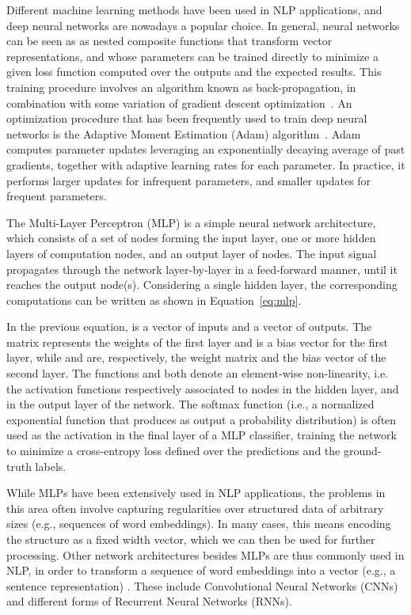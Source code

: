 Different machine learning methods have been used in NLP applications, and deep neural networks are nowadays a popular choice. In general, neural networks can be seen as as nested composite functions that transform vector representations, and whose parameters can be trained directly to minimize a given loss function computed over the outputs and the expected results. This training procedure involves an algorithm known as back-propagation, in combination with some variation of gradient descent optimization~\citep{primer}. An optimization procedure that has been frequently used to train deep neural networks is the Adaptive Moment Estimation (Adam) algorithm~\cite{kingma2014adam}. Adam computes parameter updates leveraging an exponentially decaying average of past gradients, together with adaptive learning rates for each parameter. In practice, it performs larger updates for infrequent parameters, and smaller updates for frequent parameters.

The Multi-Layer Perceptron (MLP) is a simple neural network architecture, which consists of a set of nodes forming the input layer, one or more hidden layers of computation nodes, and an output layer of nodes. The input signal propagates through the network layer-by-layer in a feed-forward manner, until it reaches the output node(s). Considering a single hidden layer, the corresponding computations can be written as shown in Equation~\ref{eq:mlp}.

In the previous equation,  is a vector of inputs and   a vector of outputs. The matrix  represents the weights of the first layer and  is a bias vector for the first layer, while  and  are, respectively, the weight matrix and the bias vector of the second layer. The functions  and  both denote an element-wise non-linearity, i.e. the activation functions respectively associated to nodes in the hidden layer, and in the output layer of the network. The softmax function (i.e., a normalized exponential function that produces as output a probability distribution) is often used as the activation in the final layer of a MLP classifier, training the network to minimize a cross-entropy loss defined over the predictions and the ground-truth labels.

While MLPs have been extensively used in NLP applications, the problems in this area often involve capturing regularities over structured data of arbitrary sizes (e.g., sequences of word embeddings). In many cases, this means encoding the structure as a fixed width vector, which we can then be used for further processing. Other network architectures besides MLPs are thus commonly used in NLP, in order to transform a sequence of word embeddings  into a vector (e.g., a sentence representation) . These include Convolutional Neural Networks (CNNs) and different forms of Recurrent Neural Networks (RNNs).

